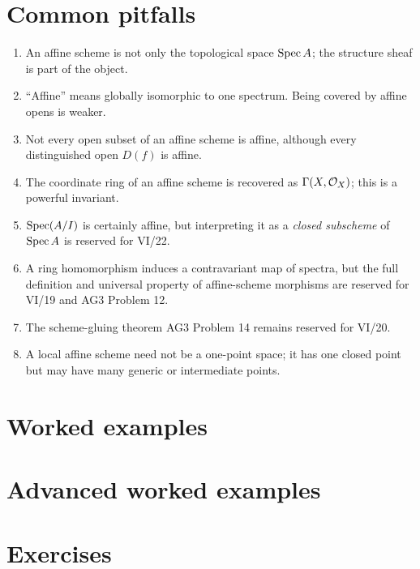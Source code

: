 

\section{Common pitfalls}
\begin{enumerate}
\item An affine scheme is not only the topological space $\operatorname{Spec} A$; the structure sheaf is
part of the object.
\item ``Affine'' means globally isomorphic to one spectrum.  Being covered by affine opens
is weaker.
\item Not every open subset of an affine scheme is affine, although every distinguished open
$D(f)$ is affine.
\item The coordinate ring of an affine scheme is recovered as $\Gamma(X,\mathcal O_X)$; this is a
powerful invariant.
\item $\operatorname{Spec}(A/I)$ is certainly affine, but interpreting it as a \emph{closed subscheme} of
$\operatorname{Spec} A$ is reserved for VI/22.
\item A ring homomorphism induces a contravariant map of spectra, but the full definition and
universal property of affine-scheme morphisms are reserved for VI/19 and AG3 Problem 12.
\item The scheme-gluing theorem AG3 Problem 14 remains reserved for VI/20.
\item A local affine scheme need not be a one-point space; it has one closed point but may
have many generic or intermediate points.
\end{enumerate}

\section{Worked examples}


\section{Advanced worked examples}


\section{Exercises}

\ifdefined\IncludeExerciseHints

\fi

